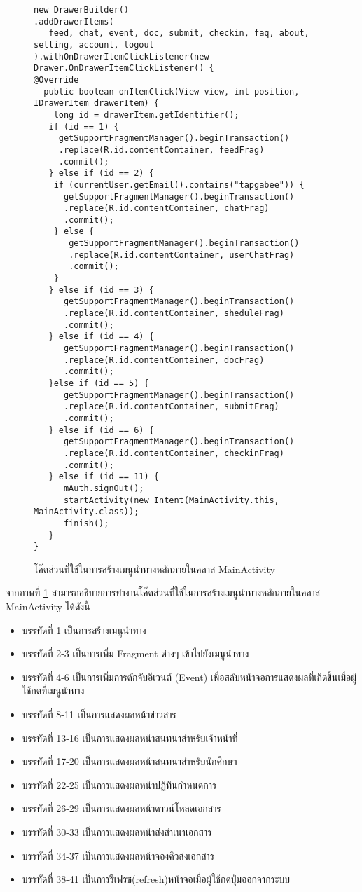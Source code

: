 		\begin{figure}[H]
			{\begin{lstlisting}
new DrawerBuilder()
.addDrawerItems(
   feed, chat, event, doc, submit, checkin, faq, about, setting, account, logout
).withOnDrawerItemClickListener(new Drawer.OnDrawerItemClickListener() {
@Override
  public boolean onItemClick(View view, int position, IDrawerItem drawerItem) {
    long id = drawerItem.getIdentifier();
   if (id == 1) {
     getSupportFragmentManager().beginTransaction()
     .replace(R.id.contentContainer, feedFrag)
     .commit();
   } else if (id == 2) {
    if (currentUser.getEmail().contains("tapgabee")) {
      getSupportFragmentManager().beginTransaction()
      .replace(R.id.contentContainer, chatFrag)
      .commit();
    } else {
       getSupportFragmentManager().beginTransaction()
       .replace(R.id.contentContainer, userChatFrag)
       .commit();
    }
   } else if (id == 3) {
      getSupportFragmentManager().beginTransaction()
      .replace(R.id.contentContainer, sheduleFrag)
      .commit();
   } else if (id == 4) {
      getSupportFragmentManager().beginTransaction()
      .replace(R.id.contentContainer, docFrag)
      .commit();
   }else if (id == 5) {
      getSupportFragmentManager().beginTransaction()
      .replace(R.id.contentContainer, submitFrag)
      .commit();
   } else if (id == 6) {
      getSupportFragmentManager().beginTransaction()
      .replace(R.id.contentContainer, checkinFrag)
      .commit();
   } else if (id == 11) {
      mAuth.signOut();
      startActivity(new Intent(MainActivity.this, MainActivity.class));
      finish();
   }
}
				\end{lstlisting}}
			\caption{โค๊ดส่วนที่ใช้ในการสร้างเมนูนำทางหลักภายในคลาส MainActivity}
			\label{Fig:MainActivity2}
		\end{figure}

		จากภาพที่ \ref{Fig:MainActivity2} สามารถอธิบายการทำงานโค๊ดส่วนที่ใช้ในการสร้างเมนูนำทางหลักภายในคลาส MainActivity ได้ดังนี้
		\begin{itemize}[label={--}]
			\item บรรทัดที่ 1 เป็นการสร้างเมนูนำทาง
			\item บรรทัดที่ 2-3 เป็นการเพิ่ม Fragment ต่างๆ เข้าไปยังเมนูนำทาง
			\item บรรทัดที่ 4-6 เป็นการเพิ่มการดักจับอีเวนต์ (Event) เพื่อสลับหน้าจอการแสดงผลที่เกิดขึ้นเมื่อผู้ใช้กดที่เมนูนำทาง
			\item บรรทัดที่ 8-11 เป็นการแสดงผลหน้าข่าวสาร
			\item บรรทัดที่ 13-16 เป็นการแสดงผลหน้าสนทนาสำหรับเจ้าหน้าที่
			\item บรรทัดที่ 17-20 เป็นการแสดงผลหน้าสนทนาสำหรับนักศึกษา
			\item บรรทัดที่ 22-25 เป็นการแสดงผลหน้าปฏิทินกำหนดการ
			\item บรรทัดที่ 26-29 เป็นการแสดงผลหน้าดาวน์โหลดเอกสาร
			\item บรรทัดที่ 30-33 เป็นการแสดงผลหน้าส่งสำเนาเอกสาร
			\item บรรทัดที่ 34-37 เป็นการแสดงผลหน้าจองคิวส่งเอกสาร
			\item บรรทัดที่ 38-41 เป็นการรีเฟรช(refresh)หน้าจอเมื่อผู้ใช้กดปุ่มออกจากระบบ
		\end{itemize}
	
